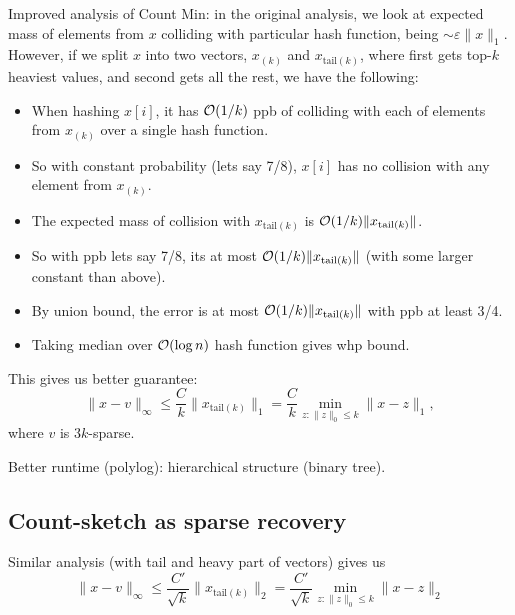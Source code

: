 \documentclass[11pt]{article}
\begin{document}
Improved analysis of Count Min: in the original analysis, we look at expected mass of elements from $x$ colliding with particular hash function, being $\sim \varepsilon \|x\|_1$. However, if we split $x$ into two vectors, $x_{(k)}$ and $x_{\text{tail}(k)}$, where first gets top-$k$ heaviest values, and second gets all the rest, we have the following:
\begin{itemize}
\item When hashing $x[i]$, it has $\mathcal{O}(1/k)$ ppb of colliding with each of elements from $x_{(k)}$ over a single hash function.
\item So with constant probability (lets say 7/8), $x[i]$ has no collision with any element from $x_{(k)}$.
\item The expected mass of collision with $x_{\text{tail}(k)}$ is $\mathcal{O}(1/k) \|x_{\text{tail}(k)}\|$.
\item So with ppb lets say 7/8, its at most $\mathcal{O}(1/k) \|x_{\text{tail}(k)}\|$ (with some larger constant than above).
\item By union bound, the error is at most $\mathcal{O}(1/k) \|x_{\text{tail}(k)}\|$ with ppb at least 3/4.
\item Taking median over $\mathcal{O}(\log n)$ hash function gives whp bound.
\end{itemize}

This gives us better guarantee:
$$ \|x-v\|_\infty \le  \frac{C}{k} \|x_{\text{tail}(k)}\|_1 = \frac{C}{k} \min_{z : \|z\|_0 \le k} \|x-z\|_1,$$
where $v$ is $3k$-sparse.


Better runtime (polylog): hierarchical structure (binary tree).


\subsection{Count-sketch as sparse recovery}
Similar analysis (with tail and heavy part of vectors) gives us
$$ \|x - v\|_\infty \le \frac{C'}{\sqrt{k}} \|x_{\text{tail}(k)}\|_2 =  \frac{C'}{\sqrt{k}} \min_{z : \|z\|_0 \le k} \|x-z\|_2$$



\end{document}
